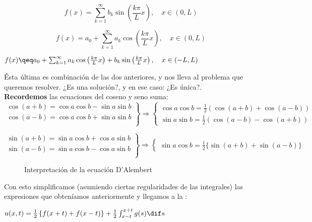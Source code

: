 		\[ f(x) = \sum_{k=1}^{\infty} b_k \sin \left( \frac{k \pi}{L} x \right), \quad x \in (0,L) \]

		\[ f(x) = a_0 + \sum^{\infty}_{k=1} a_k \cos \left( \frac{k \pi}{L} x \right), \quad x \in (0,L) \]

		\(
		f(x) \qeq a_0 + \sum^{\infty}_{k=1} a_k \cos \left( \frac{k \pi}{L} x \right) + b_k \sin \left( \frac{k \pi}{L} x \right), \quad x \in (-L,L)
		\)

		Ésta última es combinación de las dos anteriores, y nos lleva al problema que queremos resolver. ¿Es una solución?, y en ese caso: ¿Es única?.\\

		\textbf{Recordemos} las ecuaciones del coseno y seno suma:
		\[
		\left. \begin{array}{r}
			\cos (a + b) = \cos a \cos b - \sin a \sin b \\
			\cos (a - b) = \cos a \cos b + \sin a \sin b \\
		\end{array} \right\} \Rightarrow \left\{ \begin{array}{l}
			\cos a \cos b = \frac{1}{2} (\cos (a+b) + \cos (a-b)) \\
			\sin a \sin b = \frac{1}{2} (\cos (a-b) - \cos (a+b))
		\end{array} \right.
		\]

		\[
		\left. \begin{array}{r}
			\sin (a + b) = \sin a \cos b + \cos a \sin b \\
			\sin (a - b) = \sin a \cos b - \cos a \sin b \\
		\end{array} \right\} \Rightarrow \left\{ \begin{array}{l}
			\sin a \cos b = \frac{1}{2} \{\sin (a+b) + \sin(a-b)\}
		\end{array} \right.
		\]

		\begin{figure}[thbp]
		\centering
		\caption{Interpretación de la ecuación D'Alembert}
		\label{fig:interpretacionDalembert}
		\end{figure}

		Con esto simplificamos (asumiendo ciertas regularidades de las integrales) las expresiones que obteníamos anteriormente y llegamos a la :

		\( u(x,t) = \frac{1}{2} \left\{ f(x+t) + f(x-t) \right\} + \frac{1}{2} \int^{x+t}_{x-t} g(s) \dif s  \label{eq:DALEMBERT} \)

